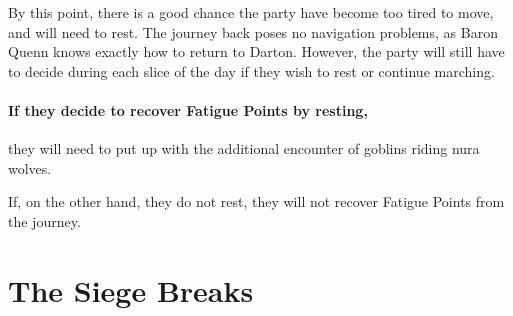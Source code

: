 \begin{multicols}{2}
By this point, there is a good chance the party have become too tired to move, and will need to rest.
The journey back poses no navigation problems, as Baron Quenn knows exactly how to return to Darton.
However, the party will still have to decide during each slice of the day if they wish to rest or continue marching.
\paragraph{If they decide to recover Fatigue Points by resting,}
they will need to put up with the additional encounter of goblins riding nura wolves.



If, on the other hand, they do not rest, they will not recover Fatigue Points from the journey.


\end{multicols}

\section{The Siege Breaks}

